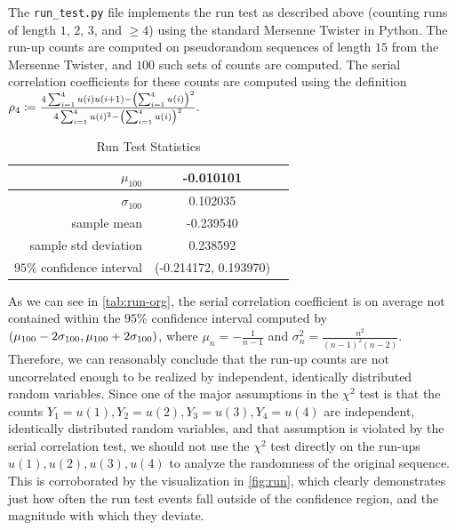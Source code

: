\documentclass{article}
\renewcommand{\geq}{\geqslant}
\newcommand{\defn}{\coloneqq}
\DeclarePairedDelimiter \parens{(}{)}
\begin{document}
\begin{enumerate}
        The \texttt{run\_test.py} file implements the run test as described above (counting runs of length $1$, $2$, $3$, and $\geq 4$)
        using the standard Mersenne Twister in Python.
        The run-up counts are computed on pseudorandom sequences of length $15$ from the Mersenne Twister, and $100$ such sets of counts are computed.
        The serial correlation coefficients for these counts are computed using the definition
        $\rho_4 \defn \frac{4 \sum_{i = 1}^{4}u(i)u(i+1) - \parens*{\sum_{i = 1}^{4}u(i)}^2}{4 \sum_{i = 1}^{4}u(i)^2 - \parens*{\sum_{i = 1}^{4}u(i)}^2}.$

        \begin{table}[H]
            \centering
            \caption{Run Test Statistics}
            \begin{tabular}{|r|c|c|} \hline
                \multicolumn{1}{|r|}{$\mu_{100}$}                   & \multicolumn{1}{|c|}{-0.010101}   \\ \hline
                \multicolumn{1}{|r|}{$\sigma_{100}$}                & \multicolumn{1}{|c|}{0.102035}    \\ \hline
                \multicolumn{1}{|r|}{sample mean}                   & \multicolumn{1}{|c|}{-0.239540}   \\ \hline
                \multicolumn{1}{|r|}{sample std deviation}          & \multicolumn{1}{|c|}{0.238592}    \\ \hline
                \multicolumn{1}{|r|}{$95\%$ confidence interval}    & \multicolumn{1}{|c|}{(-0.214172, 0.193970)}    \\ \hline
            \end{tabular}
            \label{tab:run-org}
        \end{table}

        As we can see in \autoref{tab:run-org}, the serial correlation coefficient is on average not contained within the $95\%$ confidence interval computed by
        $\parens*{\mu_{100} - 2\sigma_{100}, \mu_{100} + 2\sigma_{100}}$,
        where $\mu_n = -\frac{1}{n-1}$ and $\sigma_n^2 = \frac{n^2}{(n-1)^2(n-2)}$.
        Therefore, we can reasonably conclude that the run-up counts are not uncorrelated enough to be realized by independent, identically distributed random variables.
        Since one of the major assumptions in the $\chi^2$ test is that the counts $Y_1 = u(1), Y_2 = u(2), Y_3 = u(3), Y_4 = u(4)$ are
        independent, identically distributed random variables, and that assumption is violated by the serial correlation test,
        we should not use the $\chi^2$ test directly on the run-ups $u(1), u(2), u(3), u(4)$ to analyze the randomness of the original sequence.
        This is corroborated by the visualization in \autoref{fig:run}, which clearly demonstrates just how often the run test events fall outside of the confidence region,
        and the magnitude with which they deviate.


\end{enumerate}
\end{document}

